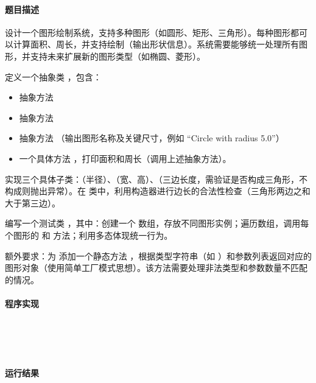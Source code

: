\documentclass{academics}
\begin{document}
\paragraph{题目描述} {
    设计一个图形绘制系统，支持多种图形（如圆形、矩形、三角形）。每种图形都可以计算面积、周长，并支持绘制（输出形状信息）。系统需要能够统一处理所有图形，并支持未来扩展新的图形类型（如椭圆、菱形）。

    定义一个抽象类 ，包含：
    \begin{itemize}
        \item 抽象方法 
        \item 抽象方法 
        \item 抽象方法 （输出图形名称及关键尺寸，例如 ``Circle with radius 5.0''）
        \item 一个具体方法 ，打印面积和周长（调用上述抽象方法）。
    \end{itemize}
    实现三个具体子类：（半径）、（宽、高）、（三边长度，需验证是否构成三角形，不构成则抛出异常）。在  类中，利用构造器进行边长的合法性检查（三角形两边之和大于第三边）。

    编写一个测试类 ，其中：创建一个  数组，存放不同图形实例；遍历数组，调用每个图形的  和  方法；利用多态体现统一行为。

    额外要求：为  添加一个静态方法 ，根据类型字符串（如 ）和参数列表返回对应的图形对象（使用简单工厂模式思想）。该方法需要处理非法类型和参数数量不匹配的情况。
}

\paragraph{程序实现} {
    \inputminted[label=Shape.java]{java}{../src/P01/Shape.java}
    \inputminted[label=Circle.java]{java}{../src/P01/Circle.java}
    \inputminted[label=Rectangle.java]{java}{../src/P01/Rectangle.java}
    \inputminted[label=Triangle.java]{java}{../src/P01/Triangle.java}
    \inputminted[label=DrawingApp.java]{java}{../src/P01/DrawingApp.java}
}

\paragraph{运行结果} {
    \inputminted{text}{../res/P01.out}
}
\end{document}
